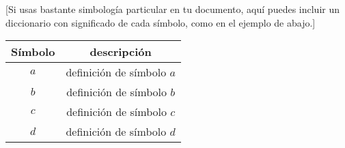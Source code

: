 
\begin{symbols}

[Si usas bastante simbología particular en tu documento, aquí puedes incluir un diccionario con significado de cada símbolo, como en el ejemplo de abajo.]

\begin{table}[htbp]
	\begin{center}
		\begin{tabular}{|c|c|}
		\hline
		\textbf{Símbolo} & \textbf{descripción} \\
    \hline
    $a$ & definición de símbolo $a$ \\
    \hline
    $b$ & definición de símbolo $b$ \\
    \hline
    $c$ & definición de símbolo $c$ \\
    \hline
    $d$ & definición de símbolo $d$ \\
    \hline    
    \end{tabular}
	\end{center}
\end{table}

\end{symbols}

